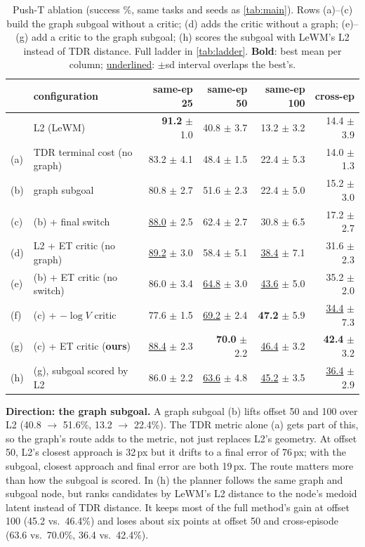 \documentclass{article} %
\begin{document}
\begin{table}[t]
\centering\small
\caption{Push-T ablation (success \%, same tasks and seeds as \cref{tab:main}). Rows (a)--(c)
build the graph subgoal without a critic; (d) adds the critic without a graph; (e)--(g) add a
critic to the graph subgoal; (h) scores the subgoal with LeWM's L2 instead of TDR distance.
Full ladder in \cref{tab:ladder}. \textbf{Bold}: best mean per column; \underline{underlined}:
$\pm$sd interval overlaps the best's.}
\label{tab:ablation}
\begin{tabular}{llrrrr}
\toprule
& configuration & same-ep 25 & same-ep 50 & same-ep 100 & cross-ep \\
\midrule
& L2 (LeWM) & \textbf{91.2} $\pm$ 1.0 & 40.8 $\pm$ 3.7 & 13.2 $\pm$ 3.2 & 14.4 $\pm$ 3.9 \\
(a) & TDR terminal cost (no graph) & 83.2 $\pm$ 4.1 & 48.4 $\pm$ 1.5 & 22.4 $\pm$ 5.3 & 14.0 $\pm$ 1.3 \\
(b) & graph subgoal & 80.8 $\pm$ 2.7 & 51.6 $\pm$ 2.3 & 22.4 $\pm$ 5.0 & 15.2 $\pm$ 3.0 \\
(c) & (b) + final switch & \underline{88.0} $\pm$ 2.5 & 62.4 $\pm$ 2.7 & 30.8 $\pm$ 6.5 & 17.2 $\pm$ 2.7 \\
\midrule
(d) & L2 + ET critic (no graph) & \underline{89.2} $\pm$ 3.0 & 58.4 $\pm$ 5.1 & \underline{38.4} $\pm$ 7.1 & 31.6 $\pm$ 2.3 \\
(e) & (b) + ET critic (no switch) & 86.0 $\pm$ 3.4 & \underline{64.8} $\pm$ 3.0 & \underline{43.6} $\pm$ 5.0 & 35.2 $\pm$ 2.0 \\
(f) & (c) + $-\log V$ critic & 77.6 $\pm$ 1.5 & \underline{69.2} $\pm$ 2.4 & \textbf{47.2} $\pm$ 5.9 & \underline{34.4} $\pm$ 7.3 \\
(g) & (c) + ET critic (\textbf{ours}) & \underline{88.4} $\pm$ 2.3 & \textbf{70.0} $\pm$ 2.2 & \underline{46.4} $\pm$ 3.2 & \textbf{42.4} $\pm$ 3.2 \\
(h) & (g), subgoal scored by L2 & 86.0 $\pm$ 2.2 & \underline{63.6} $\pm$ 4.8 & \underline{45.2} $\pm$ 3.5 & \underline{36.4} $\pm$ 2.9 \\
\bottomrule
\end{tabular}
\end{table}

\textbf{Direction: the graph subgoal.} A graph subgoal (b) lifts offset 50 and 100 over L2
(40.8 $\to$ 51.6\%, 13.2 $\to$ 22.4\%). The TDR metric alone (a) gets part of this, so the
graph's route adds to the metric, not just replaces L2's geometry. At offset 50, L2's closest
approach is 32\,px but it drifts to a final error of 76\,px; with the subgoal, closest approach
and final error are both 19\,px. The route matters more than how the subgoal is scored. In (h)
the planner follows the same graph and subgoal node, but ranks candidates by LeWM's L2 distance
to the node's medoid latent instead of TDR distance. It keeps most of the full method's gain at
offset 100 (45.2 vs.\ 46.4\%) and loses about six points at offset 50 and cross-episode
(63.6 vs.\ 70.0\%, 36.4 vs.\ 42.4\%).
\end{document}
